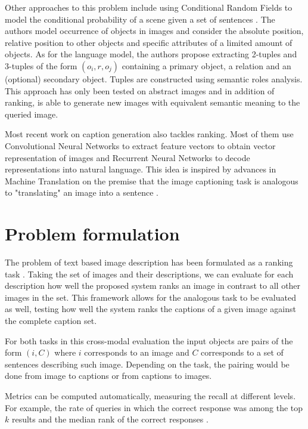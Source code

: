 \documentclass[11pt]{article}
\begin{document}
Other approaches to this problem include using Conditional Random Fields to model the conditional probability of a scene given a set of sentences \cite{6751319}. The authors model occurrence of objects in images and consider the absolute position, relative position to other objects and specific attributes of a limited amount of objects. As for the language model, the authors propose extracting 2-tuples and 3-tuples of the form $(o_i, r, o_j)$ containing a primary object, a relation and an (optional) secondary object. Tuples are constructed using semantic roles analysis. This approach has only been tested on abstract images and in addition of ranking, is able to generate new images with equivalent semantic meaning to the queried image. 

Most recent work on caption generation also tackles ranking. Most of them use Convolutional Neural Networks to extract feature vectors to obtain vector representation of images and Recurrent Neural Networks to decode representations into natural language. This idea is inspired by advances in Machine Translation on the premise that the image captioning task is analogous to "translating" an image into a sentence \cite{DBLP:journals/corr/XuBKCCSZB15} . 


\section{Problem formulation}

The problem of text based image description has been formulated as a ranking task \cite{Hodosh:2013:FID:2566972.2566993}. Taking the set of images and their descriptions, we can evaluate for each description how well the proposed system ranks an image in contrast to all other images in the set. This framework allows for the analogous task to be evaluated as well, testing how well the system ranks the captions of a given image against the complete caption set. 

For both tasks in this cross-modal evaluation the input objects are pairs of the form $(i, C)$ where $i$ corresponds to an image and $C$ corresponds to a set of sentences describing such image. Depending on the task, the pairing would be done from image to captions or from captions to images. 

Metrics can be computed automatically, measuring the recall at different levels. For example, the rate of queries in which the correct response was among the top $k$ results and the median rank of the correct responses \cite{Hodosh:2013:FID:2566972.2566993}. 
\end{document}

